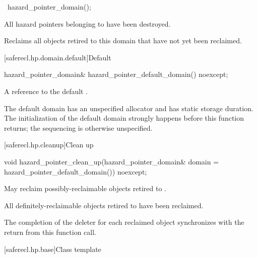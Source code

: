 \begin{itemdecl}
~hazard_pointer_domain();
\end{itemdecl}

\begin{itemdescr}

\expects
All hazard pointers belonging to  have been destroyed.

\effects
Reclaims all objects retired to this domain that have not yet been reclaimed.

\end{itemdescr}

[saferecl.hp.domain.default]{Default }

\begin{itemdecl}
hazard_pointer_domain& hazard_pointer_default_domain() noexcept;
\end{itemdecl}

\begin{itemdescr}

\returns 
A reference to the default .

\remarks 
The default domain has an unspecified allocator and has static storage
duration. The initialization of the default domain strongly happens before this function
returns; the sequencing is otherwise unspecified.

\end{itemdescr}

[saferecl.hp.cleanup]{Clean up}

\begin{itemdecl}
void hazard_pointer_clean_up(hazard_pointer_domain& domain = hazard_pointer_default_domain())
  noexcept;
\end{itemdecl}

\begin{itemdescr}

\effects 
May reclaim possibly-reclaimable objects retired to .

\ensures 
All definitely-reclaimable objects retired to  have been reclaimed.

\sync 
The completion of the deleter for each reclaimed object synchronizes with the return from this function call.

\end{itemdescr}

[saferecl.hp.base]{Class template }

